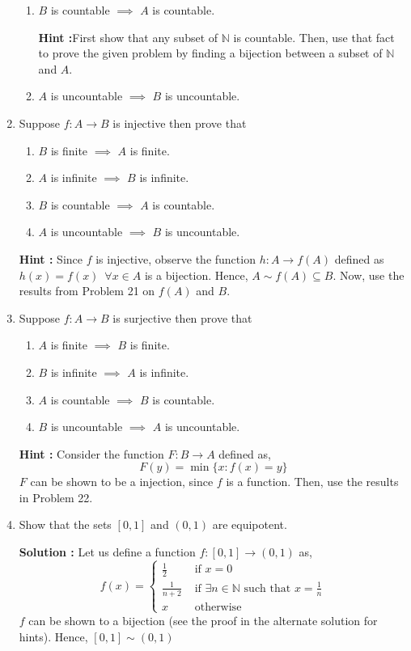 \documentclass[10pt]{article}
\newcommand{\nn}{\mathbb{N}}
\begin{document}
\begin{enumerate}
\begin{enumerate}
        \item $B$ is countable $\implies$ $A$ is countable.

		\textbf{Hint :}First show that any subset of $\nn$ is countable. Then, use that fact to prove the given problem by 
		finding a bijection between a subset of $\nn$ and $A$.
        \item $A$ is uncountable $\implies$ $B$ is uncountable.
    \end{enumerate}
    \item Suppose $f : A \to B$ is injective then prove that 
    \begin{enumerate}
        \item $B$ is finite $\implies$ $A$ is finite.
        \item $A$ is infinite $\implies$ $B$ is infinite.
        \item $B$ is countable $\implies$ $A$ is countable.
        \item $A$ is uncountable $\implies$ $B$ is uncountable.
    \end{enumerate}
    \textbf{Hint : }Since $f$ is injective, observe the function $h: A \to f(A)$ defined as $h(x) = f(x) \,\,\, \forall x \in A$ is a bijection.
    Hence, $A \sim f(A) \subseteq B$. Now, use the results from Problem 21 on $f(A)$ and $B$.
    \item Suppose $f : A \to B$ is surjective then prove that 
    \begin{enumerate}
        \item $A$ is finite $\implies$ $B$ is finite.
        \item $B$ is infinite $\implies$ $A$ is infinite.
        \item $A$ is countable $\implies$ $B$ is countable.
        \item $B$ is uncountable $\implies$ $A$ is uncountable.
    \end{enumerate}
    \textbf{Hint : }Consider the function $F : B \to A$ defined as,
    $$F(y) = \min \{x : f(x) = y \}$$ 
    $F$ can be shown to be a injection, since $f$ is a function. Then, use the results in Problem 22.
    \item Show that the sets $[0, 1]$ and $(0, 1)$ are equipotent.
    
	    \textbf{Solution : } Let us define a function $f : [0, 1] \to (0, 1)$ as,
	    \begin{equation*}
		    f(x)=
		    \begin{cases}
			    \frac{1}{2} & \text{ if }x = 0 \\
			    \frac{1}{n + 2} & \text{ if } \exists n \in \nn \text{ such that } x = \frac{1}{n} \\
			    x & \text{ otherwise }
		    \end{cases}
	    \end{equation*}
	    $f$ can be shown to a bijection (see the proof in the alternate solution for hints). Hence, 
	    $[0, 1] \sim (0, 1)$


\end{enumerate}
\end{document}
